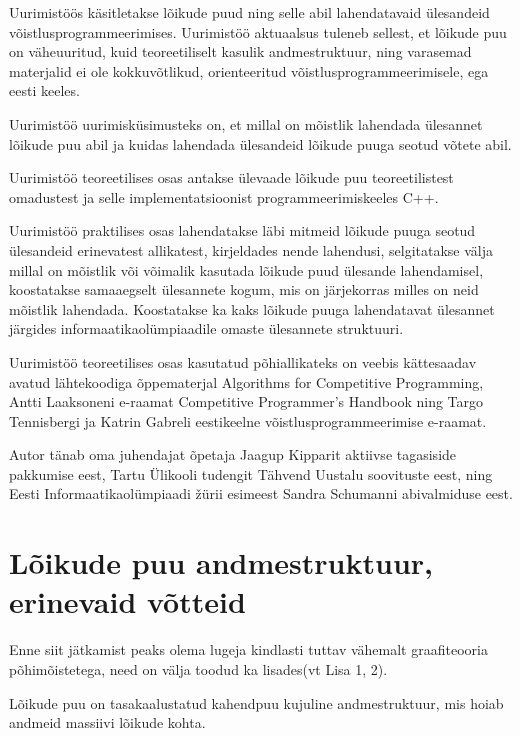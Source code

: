 \documentclass{trkut}
\begin{document}
\maketitle%
\tableofcontents%

Uurimistöös käsitletakse lõikude puud ning selle abil lahendatavaid ülesandeid võistlusprogrammeerimises. Uurimistöö aktuaalsus tuleneb sellest, et lõikude puu on väheuuritud, kuid teoreetiliselt kasulik andmestruktuur, ning varasemad materjalid ei ole kokkuvõtlikud, orienteeritud võistlusprogrammeerimisele, ega eesti keeles.


Uurimistöö uurimisküsimusteks on, et millal on mõistlik lahendada ülesannet lõikude puu abil ja kuidas lahendada ülesandeid lõikude puuga seotud võtete abil.

Uurimistöö teoreetilises osas antakse ülevaade lõikude puu teoreetilistest omadustest ja selle implementatsioonist programmeerimiskeeles C++.

Uurimistöö praktilises osas lahendatakse läbi mitmeid lõikude puuga seotud ülesandeid erinevatest allikatest, kirjeldades nende lahendusi, selgitatakse välja millal on mõistlik või võimalik kasutada lõikude puud ülesande lahendamisel, koostatakse samaaegselt ülesannete kogum, mis on järjekorras milles on neid mõistlik lahendada. Koostatakse ka kaks lõikude puuga lahendatavat ülesannet järgides informaatikaolümpiaadile omaste ülesannete struktuuri.

Uurimistöö teoreetilises osas kasutatud põhiallikateks on veebis kättesaadav avatud lähtekoodiga õppematerjal Algorithms for Competitive Programming, Antti Laaksoneni e-raamat Competitive Programmer’s Handbook ning Targo Tennisbergi ja Katrin Gabreli eestikeelne võistlusprogrammeerimise e-raamat.

Autor tänab oma juhendajat õpetaja Jaagup Kipparit aktiivse tagasiside pakkumise eest, Tartu Ülikooli tudengit Tähvend Uustalu soovituste eest, ning Eesti Informaatikaolümpiaadi žürii esimeest Sandra Schumanni abivalmiduse eest.

\chapter{Lõikude puu andmestruktuur, erinevaid võtteid}
Enne siit jätkamist peaks olema lugeja kindlasti tuttav vähemalt graafiteooria põhimõistetega, need on välja toodud ka lisades(vt Lisa 1, 2).

Lõikude puu on tasakaalustatud kahendpuu kujuline andmestruktuur, mis hoiab andmeid massiivi lõikude kohta.
\end{document}
